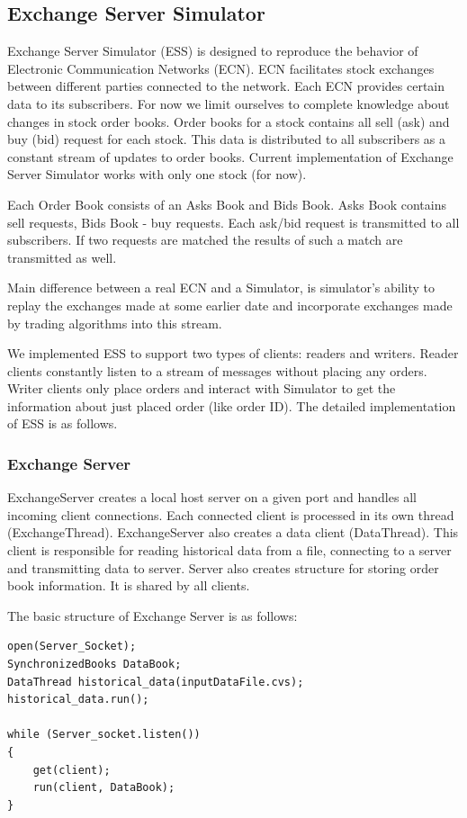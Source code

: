 \documentclass[14pt]{article}
\begin{document}
\subsection{Exchange Server Simulator}
Exchange Server Simulator (ESS) is designed to reproduce the behavior of
Electronic Communication Networks (ECN). ECN facilitates stock exchanges between
different parties connected to the network. Each ECN provides certain data to
its subscribers. For now we limit ourselves to complete knowledge about changes
in stock order books. Order books for a stock contains all sell (ask) and buy
(bid) request for each stock. This data is distributed to all subscribers as a
constant stream of updates to order books. Current implementation of Exchange
Server Simulator works with only one stock (for now).

Each Order Book consists of an Asks Book and Bids Book. Asks Book contains sell
requests, Bids Book - buy requests. Each ask/bid request is transmitted to all
subscribers. If two requests are matched the results of such a match are
transmitted as well.

Main difference between a real ECN and a Simulator, is simulator's ability to
replay the exchanges made at some earlier date and incorporate exchanges made by
trading algorithms into this stream.

We implemented ESS to support two types of clients: readers and writers. Reader
clients constantly listen to a stream of messages without placing any
orders. Writer clients only place orders and interact with Simulator to get the
information about just placed order (like order ID). The detailed implementation
of ESS is as follows.

\subsubsection{Exchange Server}
ExchangeServer creates a local host server on a given port and handles all
incoming client connections. Each connected client is processed in its own
thread (ExchangeThread). ExchangeServer also creates a data client
(DataThread). This client is responsible for reading historical data from a
file, connecting to a server and transmitting data to server. Server also
creates structure for storing order book information. It is shared by all
clients.

\noindent The basic structure of Exchange Server is as follows:
\begin{Verbatim}
open(Server_Socket);
SynchronizedBooks DataBook;
DataThread historical_data(inputDataFile.cvs);
historical_data.run();

while (Server_socket.listen())
{
    get(client);
    run(client, DataBook);
}
\end{Verbatim}
\end{document}
